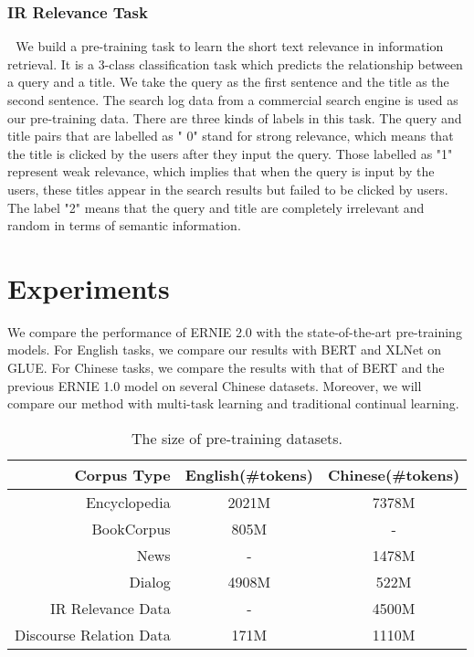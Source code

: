 \documentclass[letterpaper]{article} \usepackage{aaai20}  \usepackage{times}  \usepackage{helvet} \usepackage{courier}  \usepackage[hyphens]{url}  \usepackage{graphicx} \usepackage{makecell}
\begin{document}
\subsubsection{IR Relevance Task}  \,\, 
We build a pre-training task to learn the short text relevance in information retrieval. It is a 3-class classification task which predicts the relationship between a query and a title. We take the query as the first sentence and the title as the second sentence. The search log data from a commercial search engine is used as our pre-training data.
There are three kinds of labels in this task. The query and title pairs that are labelled as " 0" stand for strong relevance, which means that the title is clicked by the users after they input the query. Those labelled as "1" represent weak relevance, which implies that when the query is input by the users, these titles appear in the search results but failed to be clicked by users. The label "2" means that the query and title are completely irrelevant and random in terms of semantic information.

\section{Experiments}
We compare the performance of ERNIE 2.0 with the state-of-the-art pre-training models. For English tasks, we compare our results with BERT \cite{devlin2018bert} and XLNet \cite{yang2019xlnet} on GLUE. For Chinese tasks, we compare the results with that of BERT \cite{devlin2018bert} and the previous ERNIE 1.0 \cite{sun2019ernie} model on several Chinese datasets. Moreover, we will compare  our method with multi-task learning and traditional continual learning.
\begin{table}[htpb]
\centering
\small
\begin{center}
{
\begin{tabular}{@{}rcc@{}}
  \hline
  \hline
  Corpus Type     & English(\#tokens) & Chinese(\#tokens) \\ \hline
  Encyclopedia & 2021M & 7378M  \\ 
  BookCorpus  & 805M &  - \\ 
  News  & - &  1478M \\ \
  Dialog  & 4908M & 522M  \\ 
  IR Relevance Data & - & 4500M \\
  Discourse Relation Data & 171M & 1110M \\
\hline
\hline
\end{tabular}
} \end{center}
\caption{The size of pre-training datasets. }
\label{training_dataset}
\end{table}
\end{document}
